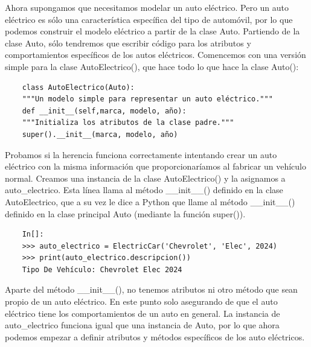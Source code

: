 {Ahora supongamos que necesitamos modelar un auto eléctrico. Pero un auto  eléctrico es sólo una característica específica del tipo de automóvil, por lo que podemos construir el modelo eléctrico  a partir de la clase {\ttfamily Auto}. Partiendo de la clase {\ttfamily Auto}, sólo tendremos que escribir código para los atributos y comportamientos específicos de los autos eléctricos. Comencemos con una versión simple para la clase {\ttfamily AutoElectrico()}, que hace todo lo que hace la clase {\ttfamily Auto()}:

\hspace{-2.6cm}{\ttfamily \scriptsize Auto}

\vspace{-0.2cm}
\hspace{-2.6cm}{\ttfamily \scriptsize Electrico.py}\vspace{-0.84cm}
\begin{lstlisting}
	class AutoElectrico(Auto):
	"""Un modelo simple para representar un auto eléctrico."""
	def __init__(self,marca, modelo, año):
	"""Initializa los atributos de la clase padre."""
	super().__init__(marca, modelo, año)
\end{lstlisting}

Probamos si la herencia funciona correctamente intentando crear un auto eléctrico con la misma
información que proporcionaríamos al fabricar un vehículo normal. 
Creamos una instancia de la clase {\ttfamily AutoElectrico()} y la asignamos a {\ttfamily auto\_electrico}. Esta línea llama al método {\ttfamily \_\!\_init\_\!\_()} definido en la clase {\ttfamily AutoElectrico}, que a su vez le dice a Python que llame al método {\ttfamily \_\!\_init\_\!\_()} definido en la clase principal {\ttfamily Auto} (mediante la función  {\ttfamily super()}).


\begin{lstlisting}
	In[]:
	>>> auto_electrico = ElectricCar('Chevrolet', 'Elec', 2024)
	>>> print(auto_electrico.descripcion())
	Tipo De Vehículo: Chevrolet Elec 2024 
\end{lstlisting} 

Aparte del método  {\ttfamily \_\!\!\_init\_\!\!\_()},  no tenemos atributos ni otro método que sean propio de un auto eléctrico. En este punto solo asegurando de que el auto eléctrico  tiene los comportamientos de un auto en general.
La instancia de {\ttfamily auto\_electrico} funciona igual que una instancia de {\ttfamily Auto}, por lo que ahora
podemos empezar a definir atributos y métodos específicos de los auto eléctricos.

}
